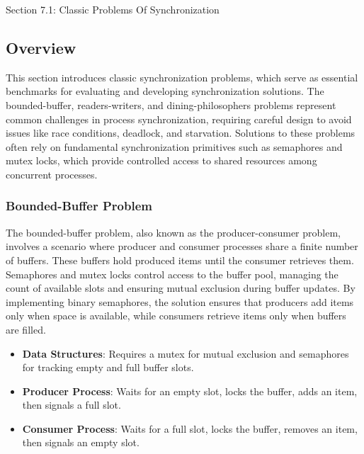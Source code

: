 \begin{notes}{Section 7.1: Classic Problems Of Synchronization}
    \subsection*{Overview}

    This section introduces classic synchronization problems, which serve as essential benchmarks for evaluating and developing synchronization solutions. The bounded-buffer, readers-writers, and 
    dining-philosophers problems represent common challenges in process synchronization, requiring careful design to avoid issues like race conditions, deadlock, and starvation. Solutions to these 
    problems often rely on fundamental synchronization primitives such as semaphores and mutex locks, which provide controlled access to shared resources among concurrent processes.
    
    \subsubsection*{Bounded-Buffer Problem}
    
    The bounded-buffer problem, also known as the producer-consumer problem, involves a scenario where producer and consumer processes share a finite number of buffers. These buffers hold produced items 
    until the consumer retrieves them. Semaphores and mutex locks control access to the buffer pool, managing the count of available slots and ensuring mutual exclusion during buffer updates. By 
    implementing binary semaphores, the solution ensures that producers add items only when space is available, while consumers retrieve items only when buffers are filled.
    
    \begin{highlight}
    
        \begin{itemize}
            \item \textbf{Data Structures}: Requires a mutex for mutual exclusion and semaphores for tracking empty and full buffer slots.
            \item \textbf{Producer Process}: Waits for an empty slot, locks the buffer, adds an item, then signals a full slot.
            \item \textbf{Consumer Process}: Waits for a full slot, locks the buffer, removes an item, then signals an empty slot.
        \end{itemize}
    

\end{highlight}
\end{notes}
